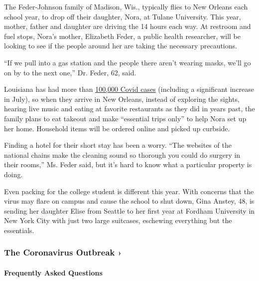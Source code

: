 The Feder-Johnson family of Madison, Wis., typically flies to New
Orleans each school year, to drop off their daughter, Nora, at Tulane
University. This year, mother, father and daughter are driving the 14
hours each way. At restroom and fuel stops, Nora's mother, Elizabeth
Feder, a public health researcher, will be looking to see if the people
around her are taking the necessary precautions.

``If we pull into a gas station and the people there aren't wearing
masks, we'll go on by to the next one,'' Dr. Feder, 62, said.

Louisiana has had more than
\href{https://eur01.safelinks.protection.outlook.com/?url=https\%3A\%2F\%2Fwww.nytimes3xbfgragh.onion\%2Finteractive\%2F2020\%2Fus\%2Flouisiana-coronavirus-cases.html\&data=02\%7C01\%7C\%7Cf98faf91db4c457cd27e08d82cdc651d\%7C84df9e7fe9f640afb435aaaaaaaaaaaa\%7C1\%7C0\%7C637308672381698693\&sdata=VRikgzNv7F\%2B0pyPzti\%2FBaZGxDJK0RPTBOb7Ya7c7ssM\%3D\&reserved=0}{100,000
Covid cases} (including a significant increase in July), so when they
arrive in New Orleans, instead of exploring the sights, hearing live
music and eating at favorite restaurants as they did in years past, the
family plans to eat takeout and make ``essential trips only'' to help
Nora set up her home. Household items will be ordered online and picked
up curbside.

Finding a hotel for their short stay has been a worry. ``The websites of
the national chains make the cleaning sound so thorough you could do
surgery in their rooms,'' Ms. Feder said, but it's hard to know what a
particular property is doing.

Even packing for the college student is different this year. With
concerns that the virus may flare on campus and cause the school to shut
down, Gina Anstey, 48, is sending her daughter Elise from Seattle to her
first year at Fordham University in New York City with just two large
suitcases, eschewing everything but the essentials.

\href{https://www.nytimes3xbfgragh.onion/news-event/coronavirus?action=click\&pgtype=Article\&state=default\&region=MAIN_CONTENT_3\&context=storylines_faq}{}

\hypertarget{the-coronavirus-outbreak-}{%
\subsubsection{The Coronavirus Outbreak
›}\label{the-coronavirus-outbreak-}}

\hypertarget{frequently-asked-questions}{%
\paragraph{Frequently Asked
Questions}\label{frequently-asked-questions}}

